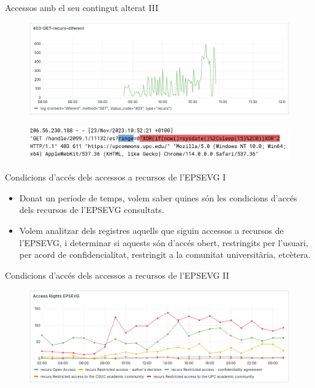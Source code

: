\begin{frame}{Accessos amb el seu contingut alterat III}
    \begin{figure}
        \includegraphics[width=\textwidth]{figures/possible-attacks-403}\label{fig:use-case-2-1}
    \end{figure}
    \begin{figure}
        \includegraphics[width=\textwidth]{figures/log-attack}\label{fig:use-case-2-2}
    \end{figure}
\end{frame}

\begin{frame}{Condicions d'accés dels accessos a recursos de l'EPSEVG I}
    \begin{itemize}
        \item Donat un període de temps, volem saber quines són les condicions d'accés dels recursos de l'EPSEVG consultats.
        \item Volem analitzar dels registres aquells que siguin accessos a recursos de l'EPSEVG, i determinar si aquests són d'accés obert, restringits per l'usuari, per acord de confidencialitat, restringit a la comunitat universitària, etcètera.
    \end{itemize}
\end{frame}

\begin{frame}{Condicions d'accés dels accessos a recursos de l'EPSEVG II}
    \begin{figure}
        \includegraphics[width=\textwidth]{figures/access-rights-epsevg}\label{fig:use-case-3}
    \end{figure}
\end{frame}